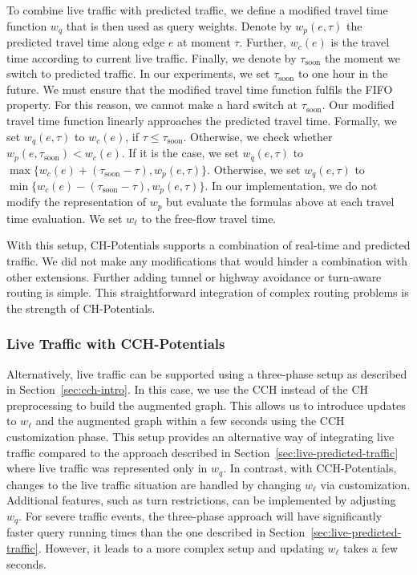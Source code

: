 \documentclass[manuscript]{acmart}
\begin{document}
To combine live traffic with predicted traffic, we define a modified travel time function $w_q$ that is then used as query weights.
Denote by $w_p(e,\tau)$ the predicted travel time along edge $e$ at moment $\tau$.
Further, $w_c(e)$ is the travel time according to current live traffic.
Finally, we denote by $\tau_{\mathrm{soon}}$ the moment we switch to predicted traffic.
In our experiments, we set $\tau_{\mathrm{soon}}$ to one hour in the future.
We must ensure that the modified travel time function fulfils the FIFO property.
For this reason, we cannot make a hard switch at $\tau_{\mathrm{soon}}$.
Our modified travel time function linearly approaches the predicted travel time. %
%
Formally, we set $w_q(e,\tau)$ to $w_c(e)$, if $\tau \leq \tau_{\mathrm{soon}}$.
Otherwise, we check whether $w_p(e,\tau_{\mathrm{soon}}) < w_c(e)$.
If it is the case, we set $w_q(e,\tau)$ to $\max\{w_c(e)+(\tau_{\mathrm{soon}}-\tau), w_p(e,\tau)\}$.
Otherwise, we set $w_q(e,\tau)$ to $\min\{w_c(e)-(\tau_{\mathrm{soon}}-\tau), w_p(e,\tau)\}$.
In our implementation, we do not modify the representation of $w_p$ but evaluate the formulas above at each travel time evaluation.
We set $w_\ell$ to the free-flow travel time.

With this setup, CH-Potentials supports a combination of real-time and predicted traffic.
We did not make any modifications that would hinder a combination with other extensions.
Further adding tunnel or highway avoidance or turn-aware routing is simple.
This straightforward integration of complex routing problems is the strength of CH-Potentials.

\subsubsection{Live Traffic with CCH-Potentials}

Alternatively, live traffic can be supported using a three-phase setup as described in Section~\ref{sec:cch-intro}.
In this case, we use the CCH instead of the CH preprocessing to build the augmented graph.
This allows us to introduce updates to $w_\ell$ and the augmented graph within a few seconds using the CCH customization phase.
This setup provides an alternative way of integrating live traffic compared to the approach described in Section~\ref{sec:live-predicted-traffic} where live traffic was represented only in $w_q$.
In contrast, with CCH-Potentials, changes to the live traffic situation are handled by changing $w_\ell$ via customization.
Additional features, such as turn restrictions, can be implemented by adjusting $w_q$.
For severe traffic events, the three-phase approach will have significantly faster query running times than the one described in Section~\ref{sec:live-predicted-traffic}.
However, it leads to a more complex setup and updating $w_\ell$ takes a few seconds.
\end{document}
